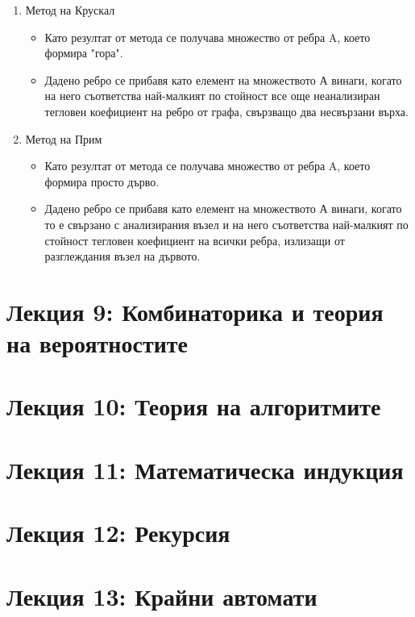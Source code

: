 \documentclass[fleqn, 12pt]{article}
\theoremstyle{definition}
\begin{document}
\begin{enumerate}
\item Метод на Крускал
\begin{itemize}
\item Като  резултат от метода се получава множество от ребра A, което формира "гора".
\item Дадено ребро се прибавя като елемент на множеството А винаги, когато на него съответства най-малкият по стойност все още неанализиран тегловен коефициент на ребро от графа,  свързващо два несвързани върха.
\end{itemize}
\item Метод на Прим
\begin{itemize}
\item Като резултат от метода се получава множество от ребра A, което формира просто дърво.
\item Дадено ребро се прибавя като елемент на множеството А винаги, когато  то е свързано с анализирания възел и на него съответства най-малкият по стойност тегловен коефициент на всички ребра, излизащи от разглеждания възел на дървото.
\end{itemize}
\end{enumerate}

\newpage
\section{Лекция 9: Комбинаторика и теория на вероятностите}

\newpage
\section{Лекция 10: Теория на алгоритмите}

\newpage
\section{Лекция 11: Математическа индукция}

\newpage
\section{Лекция 12: Рекурсия}

\newpage
\section{Лекция 13: Крайни автомати}
\end{document}
